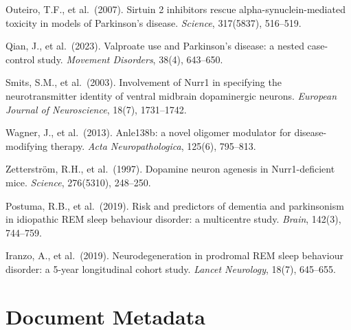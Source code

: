 \documentclass[12pt,a4paper]{article}
\begin{document}
\begin{enumerate}[label={[\arabic*]}, leftmargin=2.5em, itemsep=0.3em]
  \item Outeiro, T.F., et al.\ (2007). Sirtuin 2 inhibitors rescue
    alpha-synuclein-mediated toxicity in models of Parkinson's disease.
    \textit{Science}, 317(5837), 516--519.

  \item Qian, J., et al.\ (2023). Valproate use and Parkinson's disease:
    a nested case-control study. \textit{Movement Disorders}, 38(4),
    643--650.

  \item Smits, S.M., et al.\ (2003). Involvement of Nurr1 in specifying the
    neurotransmitter identity of ventral midbrain dopaminergic neurons.
    \textit{European Journal of Neuroscience}, 18(7), 1731--1742.

  \item Wagner, J., et al.\ (2013). Anle138b: a novel oligomer modulator
    for disease-modifying therapy. \textit{Acta Neuropathologica}, 125(6),
    795--813.

  \item Zetterström, R.H., et al.\ (1997). Dopamine neuron agenesis in
    Nurr1-deficient mice. \textit{Science}, 276(5310), 248--250.

  \item Postuma, R.B., et al.\ (2019). Risk and predictors of dementia and
    parkinsonism in idiopathic REM sleep behaviour disorder: a multicentre
    study. \textit{Brain}, 142(3), 744--759.

  \item Iranzo, A., et al.\ (2019). Neurodegeneration in prodromal REM
    sleep behaviour disorder: a 5-year longitudinal cohort study.
    \textit{Lancet Neurology}, 18(7), 645--655.
\end{enumerate}

\section*{Document Metadata}
\end{document}
